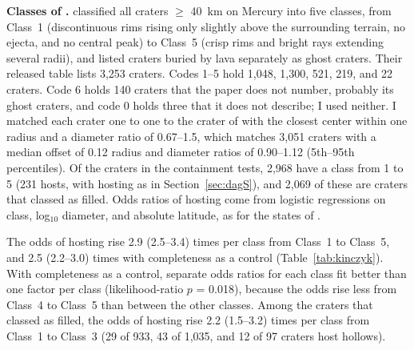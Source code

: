\documentclass{planetary}
\begin{document}
\textbf{Classes of \textcite{kinczykMorphologicalEvaluationCrater2020}.} \textcite{kinczykMorphologicalEvaluationCrater2020} classified all craters $\geq$ 40~km on Mercury into five classes, from Class~1 (discontinuous rims rising only slightly above the surrounding terrain, no ejecta, and no central peak) to Class~5 (crisp rims and bright rays extending several radii), and listed craters buried by lava separately as ghost craters. Their released table lists 3,253 craters. Codes 1--5 hold 1,048, 1,300, 521, 219, and 22 craters. Code 6 holds 140 craters that the paper does not number, probably its ghost craters, and code 0 holds three that it does not describe; I used neither. I matched each crater one to one to the crater of \textcite{herrick2018} with the closest center within one radius and a diameter ratio of 0.67--1.5, which matches 3,051 craters with a median offset of 0.12 radius and diameter ratios of 0.90--1.12 (5th--95th percentiles). Of the craters in the containment tests, 2,968 have a class from 1 to 5 (231 hosts, with hosting as in Section~\ref{sec:dagS}), and 2,069 of these are craters that \textcite{herrick2018} classed as filled. Odds ratios of hosting come from logistic regressions on class, log$_{10}$ diameter, and absolute latitude, as for the states of \textcite{herrick2018}.

The odds of hosting rise 2.9 (2.5--3.4) times per class from Class~1 to Class~5, and 2.5 (2.2--3.0) times with completeness as a control (Table~\ref{tab:kinczyk}). With completeness as a control, separate odds ratios for each class fit better than one factor per class (likelihood-ratio $p$ = 0.018), because the odds rise less from Class~4 to Class~5 than between the other classes. Among the craters that \textcite{herrick2018} classed as filled, the odds of hosting rise 2.2 (1.5--3.2) times per class from Class~1 to Class~3 (29 of 933, 43 of 1,035, and 12 of 97 craters host hollows).
\end{document}
